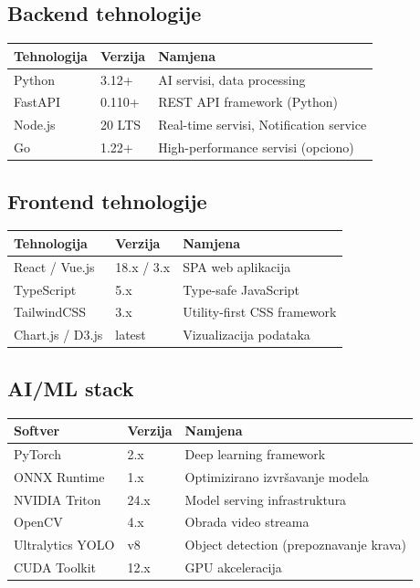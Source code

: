 \documentclass{article}
\begin{document}
\subsection{Backend tehnologije}

\begin{center}
\begin{tabular}{|l|l|l|}
\hline
\rowcolor{lightgray}
\textbf{Tehnologija} & \textbf{Verzija} & \textbf{Namjena} \\
\hline
Python & 3.12+ & AI servisi, data processing \\
\hline
FastAPI & 0.110+ & REST API framework (Python) \\
\hline
Node.js & 20 LTS & Real-time servisi, Notification service \\
\hline
Go & 1.22+ & High-performance servisi (opciono) \\
\hline
\end{tabular}
\end{center}

\subsection{Frontend tehnologije}

\begin{center}
\begin{tabular}{|l|l|l|}
\hline
\rowcolor{lightgray}
\textbf{Tehnologija} & \textbf{Verzija} & \textbf{Namjena} \\
\hline
React / Vue.js & 18.x / 3.x & SPA web aplikacija \\
\hline
TypeScript & 5.x & Type-safe JavaScript \\
\hline
TailwindCSS & 3.x & Utility-first CSS framework \\
\hline
Chart.js / D3.js & latest & Vizualizacija podataka \\
\hline
\end{tabular}
\end{center}

\subsection{AI/ML stack}

\begin{center}
\begin{tabular}{|l|l|l|}
\hline
\rowcolor{lightgray}
\textbf{Softver} & \textbf{Verzija} & \textbf{Namjena} \\
\hline
PyTorch & 2.x & Deep learning framework \\
\hline
ONNX Runtime & 1.x & Optimizirano izvršavanje modela \\
\hline
NVIDIA Triton & 24.x & Model serving infrastruktura \\
\hline
OpenCV & 4.x & Obrada video streama \\
\hline
Ultralytics YOLO & v8 & Object detection (prepoznavanje krava) \\
\hline
CUDA Toolkit & 12.x & GPU akceleracija \\
\hline
\end{tabular}
\end{center}
\end{document}

